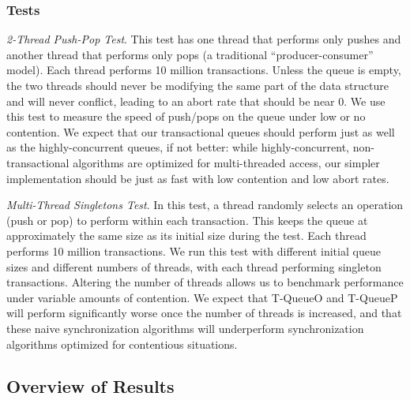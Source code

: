 \subsubsection{Tests}
    \emph{2-Thread Push-Pop Test}. This test has one thread that performs only pushes and another thread that performs only pops (a traditional ``producer-consumer'' model). Each thread performs 10 million transactions. Unless the queue is empty, the two threads should never be modifying the same part of the data structure and will never conflict, leading to an abort rate that should be near 0. We use this test to measure the speed of push/pops on the queue under low or no contention. We expect that our transactional queues should perform just as well as the highly-concurrent queues, if not better: while highly-concurrent, non-transactional algorithms are optimized for multi-threaded access, our simpler implementation should be just as fast with low contention and low abort rates.

\emph{Multi-Thread Singletons Test}.
    In this test, a thread randomly selects an operation (push or pop) to perform within each transaction. This keeps the queue at approximately the same size as its initial size during the test. Each thread performs 10 million transactions. We run this test with different initial queue sizes and different numbers of threads, with each thread performing singleton transactions. Altering the number of threads allows us to benchmark performance under variable amounts of contention. We expect that T-QueueO and T-QueueP will perform significantly worse once the number of threads is increased, and that these naive synchronization algorithms will underperform synchronization algorithms optimized for contentious situations.

\subsection{Overview of Results}

